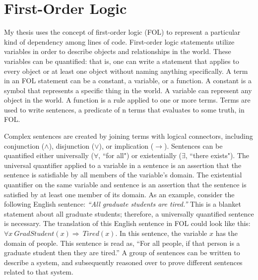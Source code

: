 

\section{First-Order Logic}

My thesis uses the concept of first-order logic (FOL) to represent a particular kind of dependency among lines of code.  First-order logic statements utilize variables in order to describe objects and relationships in the world. These variables can be quantified: that is, one can write a statement that applies to every object or at least one object without naming anything specifically. A term in an FOL statement can be a constant, a variable, or a function. A constant is a symbol that represents a specific thing in the world. A variable can represent any object in the world. A function is a rule applied to one or more terms. Terms are used to write sentences, a predicate of n terms that evaluates to some truth, in FOL.

Complex sentences are created by joining terms with logical connectors, including conjunction ($\land$), disjunction ($\lor$), or implication ($\rightarrow$). Sentences can be quantified either universally ($\forall$, ``for all") or existentially ($\exists$, ``there exists"). The universal quantifier applied to a variable in a sentence is an assertion that the sentence is satisfiable by all members of the variable's domain. The existential quantifier on the same variable and sentence is an assertion that the sentence is satisfied by at least one member of its domain. As an example, consider the following English sentence: \emph{``All graduate students are tired.''} This is a blanket statement about all graduate students; therefore, a universally quantified sentence is necessary. The translation of this English sentence in FOL could look like this: $\forall x \ GradStudent(x) \Rightarrow \ Tired(x)$. In this sentence, the variable $x$ has the domain of people. This sentence is read as, ``For all people, if that person is a graduate student then they are tired.'' A group of sentences can be written to describe a system, and subsequently reasoned over to prove different sentences related to that system.


